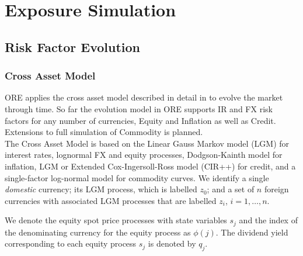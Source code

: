 \chapter{Exposure Simulation}

\section{Risk Factor Evolution}\label{sec:app_rfe}

\subsection{Cross Asset Model}

ORE applies the cross asset model described in detail in \cite{Lichters} to evolve  the market through time. So far the
evolution model in ORE supports IR and FX risk factors for any number of currencies, Equity and Inflation as well as Credit. Extensions to full simulation of Commodity is planned. \\

The Cross Asset Model is based on the Linear Gauss Markov model (LGM) for interest rates, lognormal FX and equity 
processes, Dodgson-Kainth model for inflation, LGM or Extended Cox-Ingersoll-Ross model (CIR++) for credit, and a single-factor log-normal model for commodity curves.
We identify a single {\em domestic} currency; its LGM process,
which is labelled $z_0$; and a set of $n$ foreign currencies with associated LGM processes that are labelled $z_i$, 
$i=1,\dots,n$. 

We denote the equity spot price processes with state variables $s_j$ and the index of the denominating 
currency for the equity process as $\phi(j)$. The dividend yield corresponding to each equity process $s_j$ is denoted 
by $q_j$.

